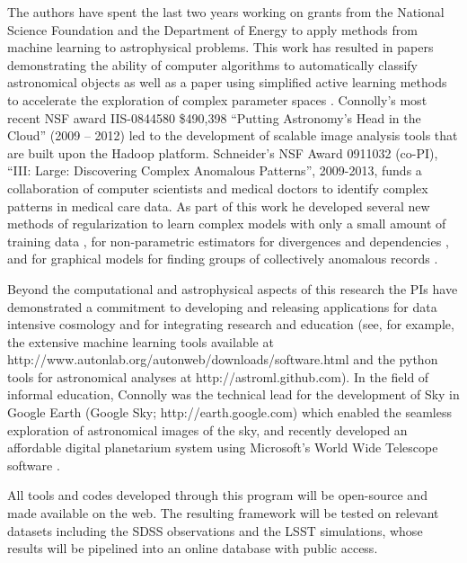 \documentclass[prd, nofootinbib, floatfix, 12pt,tightenlines]{revtex4}
\begin{document}
The authors have spent the last two years working on grants from the
National Science Foundation and the Department of Energy to apply
methods from machine learning to astrophysical problems.  This work
has resulted in papers demonstrating the ability of computer
algorithms to automatically classify astronomical objects
\cite{vdp2009,daniel2011} as well as a paper using simplified active
learning methods to accelerate the exploration of complex parameter
spaces \cite{daniel2012}.  Connolly's most recent NSF award IIS-0844580
\$490,398 ``Putting Astronomy's Head in the Cloud'' (2009 -- 2012) led
to the development of scalable image analysis tools that are built
upon the Hadoop platform\citep{wiley2011}. Schneider's NSF Award
0911032 (co-PI), ``III: Large: Discovering Complex Anomalous Patterns'',
2009-2013, funds a collaboration of computer scientists and medical
doctors to identify complex patterns in medical care data. As part of
this work he developed several new methods of regularization to learn
complex models with only a small amount of training data
\cite{YiZhangICML2010,YiZhangSDM2010,YiZhangMultitask2010,YiZhang2011multiECOC,YiZhang2012},
for non-parametric estimators for divergences and dependencies
\cite{poczos11alphadiv,Poczos2011UAI,poczos12CVPR}, and for graphical
models for finding groups of collectively anomalous records
\cite{Xiong2011gad,xiong2011fgm}.

Beyond the computational and astrophysical aspects of this research
the PIs have demonstrated a commitment to developing and releasing
applications for data intensive cosmology and for integrating research
and education (see, for example, the extensive machine learning tools
available at http://www.autonlab.org/autonweb/downloads/software.html
and the python tools for astronomical analyses at  http://astroml.github.com). In the field of
informal education, Connolly was the technical lead for the development
of Sky in Google Earth (Google Sky; http://earth.google.com) which
enabled the seamless exploration of astronomical images of the sky, and
recently developed an affordable digital planetarium system using
Microsoft's World Wide Telescope software \cite{rosenfield2011}.

All tools and codes developed through this program will be open-source
and made available on the web. The resulting framework will be tested
on relevant datasets including the SDSS observations and the LSST
simulations, whose results will be pipelined into an online database
with public access.
\end{document}
